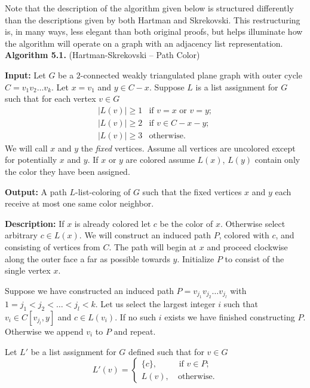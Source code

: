 \documentclass[letterpaper, 12pt]{article}
\theoremstyle{definition}
\theoremstyle{definition}
\theoremstyle{thm}
\theoremstyle{definition}
\begin{document}
Note that the description of the algorithm given below is structured differently
than the descriptions given by both Hartman and Skrekovski. This restructuring is, in
many ways, less elegant than both original proofs, but helps illuminate how the
algorithm will operate on a graph with an adjacency list representation.\\

\noindent\textbf{Algorithm 5.1.} (Hartman-Skrekovski -- Path Color)

\noindent\textbf{Input:} Let $G$ be a $2$-connected weakly triangulated plane
graph with outer cycle $C=v_1v_2\ldots v_k$. Let $x=v_1$ and $y\in C-x$.
Suppose $L$ is a list assignment for $G$ such that
for each vertex $v\in G$
\[
    \begin{array}{ll}
	    |L(v)|\ge 1 & \text{if } v=x \text{ or } v=y;\\
	    |L(v)|\ge 2 & \text{if } v\in C-x-y;\\
	    |L(v)|\ge 3 & \text{otherwise.}
    \end{array}
\]
We will call $x$ and $y$ the \textit{fixed} vertices. Assume all vertices are
uncolored except for potentially $x$ and $y$. If $x$ or $y$ are colored assume
$L(x)$, $L(y)$ contain only the color they have been assigned. 

\noindent\textbf{Output:} A path $L$-list-coloring of $G$ such that the fixed
vertices $x$ and $y$ each receive at most one same color neighbor.

\noindent\textbf{Description:} If $x$ is already colored
let $c$ be the color of $x$. Otherwise select arbitrary $c\in L(x)$. We will 
construct an induced path $P$, colored with $c$, and consisting of vertices from
$C$. The path will begin at $x$ and proceed clockwise along the outer face a
far as possible towards $y$. Initialize $P$ to consist of the single vertex
$x$.

Suppose we have constructed an induced path $P=v_{j_1}v_{j_2}\ldots v_{j_l}$
with $1=j_1<j_2<\ldots<j_l< k$. Let us select the largest integer $i$ such
that $v_i\in C[v_{j_l},y]$ and $c\in L(v_i)$. If no such $i$ exists we have
finished constructing $P$. Otherwise we append $v_i$ to $P$ and repeat.

Let $L'$ be a list assignment for $G$ defined such that for $v\in G$
\[
	L'(v) = \begin{cases}
				\{c\}, & \text{ if } v\in P;\\
				L(v), & \ \text{otherwise}.
			\end{cases}
\]
\end{document}
